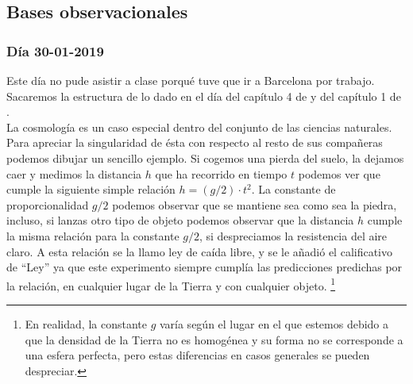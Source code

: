 \subsection{Bases observacionales}
\subsubsection{Día 30-01-2019}
Este día no pude asistir a clase porqué tuve que ir a Barcelona por trabajo. Sacaremos la estructura de lo dado en el día del capítulo 4 de  \cite{schneider2006extragalactic} y del capítulo 1 de \cite{kolb2018early}.\\

La cosmología es un caso especial dentro del conjunto de las ciencias naturales. Para apreciar la singularidad de ésta con respecto al resto de sus compañeras podemos dibujar un sencillo ejemplo. Si cogemos una pierda del suelo, la dejamos caer y medimos la distancia $h$ que ha recorrido en tiempo $t$ podemos ver que cumple la siguiente simple relación $h=(g/2)\cdot t^2$. La constante de proporcionalidad $g/2$ podemos observar que se mantiene sea como sea la piedra, incluso, si lanzas otro tipo de objeto podemos observar que la distancia $h$ cumple la misma relación para la constante $g/2$, si despreciamos la resistencia del aire claro. A esta relación se la llamo ley de caída libre, y se le añadió el calificativo de ``Ley'' ya que este experimento siempre cumplía las predicciones predichas por la relación, en cualquier lugar de la Tierra y con cualquier objeto. \footnote{En realidad, la constante $g$ varía según el lugar en el que estemos debido a que la densidad de la Tierra no es homogénea y su forma no se corresponde a una esfera perfecta, pero estas diferencias en casos generales se pueden despreciar.}\\

